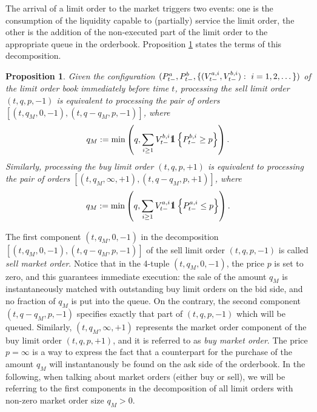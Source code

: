 \documentclass[10pt, article,table]{article}
\newtheorem{prop}[thm]{Proposition}
\begin{document}
The arrival of a limit order to the market triggers two events: one is the consumption of the liquidity capable to (partially) service the limit order, the other is the addition of the non-executed part of the limit order to the appropriate queue in the orderbook. Proposition \ref{prop.decomposition_of_limit_order} states the terms of this decomposition.

\begin{prop}\label{prop.decomposition_of_limit_order}
 Given the configuration $(\bestAskPrice_{t-}, \bestBidPrice_{t-},\lbrace  (\nthBestAskVolume[i]_{t-}, \nthBestBidVolume[i]_{t-}) : \, \, i=1,2,\dots\rbrace )$ of the limit order book immediately before time $t$, processing the sell limit order $(t,q,p,-1)$ is equivalent to processing the pair of orders $[(t,q_M,0,-1),(t,q-q_M,p,-1) ]$, where 
 \begin{equation*}
  q_M:= \min\left(q, \sum_{i\geq 1} \nthBestBidVolume[i]_{t-} \one \left\lbrace \nthBestBidPrice[i]_{t-}\geq p\right\rbrace\right).
 \end{equation*}
Similarly, processing the buy limit order $(t,q,p,+1)$ is equivalent to processing the pair of orders $[(t,q_M,\infty,+1),(t,q-q_M,p,+1) ]$, where 
 \begin{equation*}
  q_M:= \min\left (q, \sum_{i\geq 1} \nthBestAskVolume[i]_{t-} \one \left\lbrace \nthBestAskPrice[i]_{t-}\leq  p\right\rbrace\right).
 \end{equation*}
\end{prop}

The first component $(t,q_M,0,-1)$ in the decomposition $[(t,q_M,0,-1),(t,q-q_M,p,-1) ]$ of the sell limit order $(t,q,p,-1)$ is called \emph{sell market order}. Notice that in the 4-tuple $(t,q_M,0,-1)$, the price $p$ is set to zero, and this guarantees immediate execution: the sale of the amount $q_M$ is instantaneously matched with outstanding buy limit orders on the bid side, and no fraction of $q_M$ is put into the queue. On the contrary, the second component $(t,q-q_M,p,-1)$ specifies exactly that part of $(t,q,p,-1)$ which will be queued. 
Similarly, $(t,q_M,\infty,+1)$ represents the market order component of the buy limit order $(t,q,p,+1)$, and it is referred to as \emph{buy market order}. The price $p=\infty$ is a way to express the fact that a counterpart for the purchase of the amount $q_M$ will instantanously be found on the ask side of the orderbook. In the following, when talking about market orders (either buy or sell), we will be referring to the first components  in the decomposition of all limit orders with non-zero market order size $q_M >0$.
\end{document}
